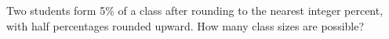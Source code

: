 Two students form 5\% of a class after rounding to the nearest integer percent, with half percentages rounded upward. How many class sizes are possible?

